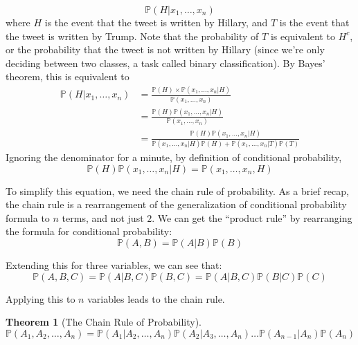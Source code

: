 \documentclass[12pt]{article} \usepackage{amsmath,amssymb,amsthm}
\newtheorem{theorem}{Theorem}[section] \newtheorem*{remark}{Remark}
\begin{document}
$$\mathbb{P}(H|x_1, \dots, x_n)$$
where $H$ is the event that the tweet is written by Hillary, and $T$ is the
event that the tweet is written by Trump. Note that the probability of $T$ is
equivalent to $H^c$, or the probability that the tweet is not written by Hillary
(since we're only deciding between two classes, a task called binary
classification). By Bayes' theorem, this is equivalent to
\begin{equation}
\begin{split}
  \mathbb{P}(H|x_1, \dots, x_n) &= \frac{\mathbb{P}(H) \times
                                  \mathbb{P}(x_1, \dots, x_n|H)}{\mathbb{P}(x_1, \dots, x_n)}\\
                                &= \frac{\mathbb{P}(H)\mathbb{P}(x_1, \dots, x_n|H)}{\mathbb{P}(x_1, \dots,
                                  x_n)}\\ 
                                &= \frac{\mathbb{P}(H)\mathbb{P}(x_1, \dots, x_n|H)}{\mathbb{P}(x_1,
                                  \dots, x_n|H)\mathbb{P}(H)+\mathbb{P}(x_1, \dots, x_n|T)\mathbb{P}(T)}
\end{split}
\end{equation}
Ignoring the denominator for a minute, by definition of conditional probability,
$$\mathbb{P}(H)\mathbb{P}(x_1, \dots, x_n|H) = \mathbb{P}(x_1, \dots, x_n, H)$$

To simplify this equation, we need the chain rule of probability. As a brief
recap, the chain rule is a rearrangement of the generalization of conditional
probability formula to $n$ terms, and not just $2$. We can get the ``product
rule'' by rearranging the formula for conditional probability:
$$\mathbb{P}(A,B) = \mathbb{P}(A|B) \mathbb{P}(B)$$

Extending this for three variables, we can see that:
$$\mathbb{P}(A,B,C) = \mathbb{P}(A|B,C) \mathbb{P}(B,C) = \mathbb{P}(A|B,C)
\mathbb{P}(B|C) \mathbb{P}(C)$$

Applying this to $n$ variables leads to the chain rule.
\begin{theorem}[The Chain Rule of Probability]
$$\mathbb{P}(A_1, A_2, \dots, A_n) = \mathbb{P}(A_1| A_2, \dots,
A_n)\mathbb{P}(A_2| A_3, \dots, A_n) \dots \mathbb{P}(A_{n-1}|A_n) \mathbb{P}(A_n)$$
\end{theorem}
\end{document}
